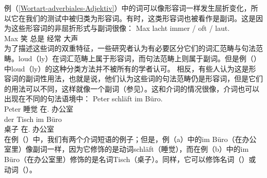 例（\ref{Wortart-adverbiales-Adjektiv}）中的词可以像形容词一样发生屈折变化，所以它在我们的测试中被归类为形容词。有时，这类形容词也被看作是副词。这是因为这些形容词的非屈折形式与副词很像：
\ea
\gll Max lacht immer / oft / laut.\\
	 Max 笑 总是 {} 经常 {} 大声\\
\z
%
为了描述这些词的双重特征，一些研究者认为有必要区分它们的词汇范畴与句法范畴。loud（ly）在词汇范畴上属于形容词，而句法范畴上则属于副词。但是例（）中loud（ly）的这种分类方法并不被所有的学者认可。
相反，有些人认为这是形容词的副词性用法，也就是说，他们认为这些词的句法范畴仍是形容词，但是它们的用法可以不同，这样就像一个副词（参见\citet[\S~7.3]{Eisenberg2004a}）。这和介词的情况很像，介词也可以出现在不同的句法语境中：
\eal
\ex 
\gll Peter schläft im Büro.\\
     Peter 睡觉 在. 办公室\\
\ex 
\gll der Tisch im Büro\\
      桌子 在. 办公室\\
\zl
在例（）中，我们有两个介词短语的例子；但是，例（a）中的im Büro（在办公室里）像副词一样，因为它修饰的是动词schläft（睡觉），而在例（b）中的im Büro（在办公室里）修饰的是名词Tisch（桌子）。同样，它可以修饰名词（）或动词（）。
